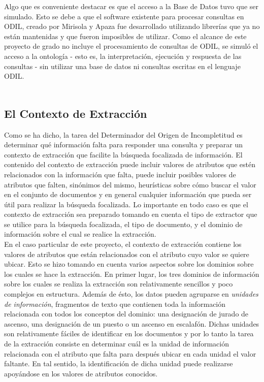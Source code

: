 Algo que es conveniente destacar es que el acceso a la Base de Datos tuvo que ser simulado. Esto se debe a que el software existente para procesar consultas en ODIL, creado por Mirisola y Apaza \cite{ODILImplementation} fue desarrollado utilizando librerías que ya no están mantenidas y que fueron imposibles de utilizar. Como el alcance de este proyecto de grado no incluye el procesamiento de consultas de ODIL, se simuló el acceso a la ontología - esto es, la interpretación, ejecución y respuesta de las consultas - sin utilizar una base de datos ni consultas escritas en el lenguaje ODIL. \\

\\

\subsection{El Contexto de Extracción}\label{sect:diseno-extCont}

Como se ha dicho, la tarea del Determinador del Origen de Incompletitud es determinar qué información falta para responder una consulta y preparar un contexto de extracción que facilite la búsqueda focalizada de información. El contenido del contexto de extracción puede incluir valores de atributos que estén relacionados con la información que falta, puede incluir posibles valores de atributos que falten, sinónimos del mismo, heurísticas sobre cómo buscar el valor en el conjunto de documentos y en general cualquier información que pueda ser útil para realizar la búsqueda focalizada. Lo importante en todo caso es que el contexto de extracción sea preparado tomando en cuenta el tipo de extractor que se utilice para la búsqueda focalizada, el tipo de documento, y el dominio de información sobre el cual se realice la extracción.\\

En el caso particular de este proyecto, el contexto de extracción contiene los valores de atributos que están relacionados con el atributo cuyo valor se quiere ubicar. Esto se hizo tomando en cuenta varios aspectos sobre los dominios sobre los cuales se hace la extracción. En primer lugar, los tres dominios de información sobre los cuales se realiza la extracción son relativamente sencillos y poco complejos en estructura. Además de ésto, los datos pueden agruparse en \emph{unidades de información}, fragmentos de texto que contienen toda la información relacionada con todos los conceptos del dominio: una designación de jurado de ascenso, una designación de un puesto o un ascenso en escalafón. Dichas unidades son relativamente fáciles de identificar en los documentos y por lo tanto la tarea de la extracción consiste en determinar cuál es la unidad de información relacionada con el atributo que falta para después ubicar en cada unidad el valor faltante. En tal sentido, la identificación de dicha unidad puede realizarse apoyándose en los valores de atributos conocidos. \\

